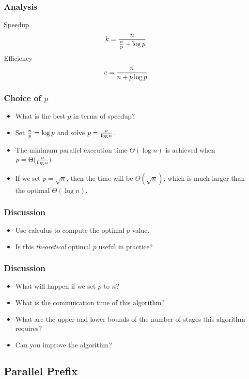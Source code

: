 \documentclass{beamer}
\begin{document}
\begin{CJK}{UTF8}{bsmi}
\begin{frame}
\frametitle{Analysis}
Speedup
\begin{equation}
k = {n \over {{n \over p} + \log p}}
\end{equation}
Efficiency
\begin{equation}
e = {n \over {{n + p \log p}}}
\end{equation}
\end{frame}

\begin{frame}
\frametitle{Choice of $p$}
\begin{itemize}
\item What is the best $p$ in terms of speedup?
\item Set ${n \over p} = \log p$ and solve $p = {n \over {\log n}}$.
\item The minimum parallel execution time $\Theta(\log n)$ is achieved when $p = \Theta({n \over {\log n}})$.
\item If we set $p = \sqrt n$, then the time will be $\Theta(\sqrt n)$, which is much larger than the optimal $\Theta(\log n)$.
\end{itemize}
\end{frame}

\begin{frame}
\frametitle{Discussion}
\begin{itemize}
\item Use calculus to compute the optimal $p$ value.
\item Is this {\em theoretical} optimal $p$ useful in practice?
\end{itemize}
\end{frame}

\begin{frame}
\frametitle{Discussion}
\begin{itemize}
\item What will happen if we set $p$ to $n$?
\item What is the commuication time of this algorithm?
  \item What are the upper and lower bounds of the number of stages this algorithm requires?
\item Can you improve the algorithm?
\end{itemize}
\end{frame}

\subsection{Parallel Prefix}


\end{CJK}
\end{document}
